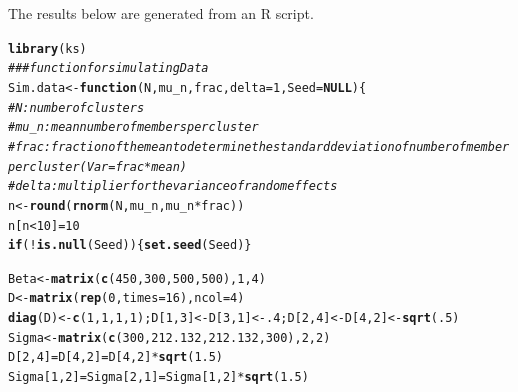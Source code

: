 \documentclass{article}\usepackage[]{graphicx}\usepackage[]{xcolor}
\makeatletter
\newcommand{\hlnum}[1]{\textcolor[rgb]{0.686,0.059,0.569}{#1}}%
\newcommand{\hlcom}[1]{\textcolor[rgb]{0.678,0.584,0.686}{\textit{#1}}}%
\newcommand{\hlopt}[1]{\textcolor[rgb]{0,0,0}{#1}}%
\newcommand{\hldef}[1]{\textcolor[rgb]{0.345,0.345,0.345}{#1}}%
\newcommand{\hlkwa}[1]{\textcolor[rgb]{0.161,0.373,0.58}{\textbf{#1}}}%
\newcommand{\hlkwb}[1]{\textcolor[rgb]{0.69,0.353,0.396}{#1}}%
\newcommand{\hlkwc}[1]{\textcolor[rgb]{0.333,0.667,0.333}{#1}}%
\newcommand{\hlkwd}[1]{\textcolor[rgb]{0.737,0.353,0.396}{\textbf{#1}}}%
\newenvironment{kframe}{%
 \def\at@end@of@kframe{}%
 \ifinner\ifhmode%
  \def\at@end@of@kframe{\end{minipage}}%
  \begin{minipage}{\columnwidth}%
 \fi\fi%
 \def\FrameCommand##1{\hskip\@totalleftmargin \hskip-\fboxsep
 \colorbox{shadecolor}{##1}\hskip-\fboxsep
     \hskip-\linewidth \hskip-\@totalleftmargin \hskip\columnwidth}%
 \MakeFramed {\advance\hsize-\width
   \@totalleftmargin\z@ \linewidth\hsize
   \@setminipage}}%
 {\par\unskip\endMakeFramed%
 \at@end@of@kframe}
\newenvironment{knitrout}{}{} %
\makeatother
\begin{document}
\title{\title{}}



\maketitle
The results below are generated from an R script.

\begin{knitrout}
\color{fgcolor}\begin{kframe}
\begin{alltt}
\hlkwd{library}\hldef{(ks)}
\hlcom{### function for simulating Data}
\hldef{Sim.data} \hlkwb{<-} \hlkwa{function}\hldef{(}\hlkwc{N}\hldef{,}\hlkwc{mu_n}\hldef{,}\hlkwc{frac}\hldef{,}\hlkwc{delta}\hldef{=}\hlnum{1}\hldef{,}\hlkwc{Seed}\hldef{=}\hlkwa{NULL}\hldef{)\{}
  \hlcom{# N: number of clusters}
  \hlcom{# mu_n: mean number of members per cluster}
  \hlcom{# frac: fraction of the mean to determine the standard deviation of number of member per cluster (Var = frac*mean)}
  \hlcom{# delta: multiplier for the variance of random effects}
  \hldef{n} \hlkwb{<-} \hlkwd{round}\hldef{(}\hlkwd{rnorm}\hldef{(N,mu_n,mu_n}\hlopt{*}\hldef{frac))}
  \hldef{n[n}\hlopt{<}\hlnum{10}\hldef{]} \hlkwb{=} \hlnum{10}
  \hlkwa{if}\hldef{(}\hlopt{!}\hlkwd{is.null}\hldef{(Seed))\{}\hlkwd{set.seed}\hldef{(Seed)\}}

  \hldef{Beta} \hlkwb{<-} \hlkwd{matrix}\hldef{(}\hlkwd{c}\hldef{(}\hlnum{450}\hldef{,}\hlnum{300}\hldef{,}\hlnum{500}\hldef{,}\hlnum{500}\hldef{),}\hlnum{1}\hldef{,}\hlnum{4}\hldef{)}
  \hldef{D} \hlkwb{<-} \hlkwd{matrix}\hldef{(}\hlkwd{rep}\hldef{(}\hlnum{0}\hldef{,} \hlkwc{times}\hldef{=}\hlnum{16}\hldef{),} \hlkwc{ncol}\hldef{=}\hlnum{4}\hldef{)}
  \hlkwd{diag}\hldef{(D)} \hlkwb{<-} \hlkwd{c}\hldef{(}\hlnum{1}\hldef{,} \hlnum{1}\hldef{,} \hlnum{1}\hldef{,} \hlnum{1}\hldef{);D[}\hlnum{1}\hldef{,} \hlnum{3}\hldef{]} \hlkwb{<-} \hldef{D[}\hlnum{3}\hldef{,} \hlnum{1}\hldef{]} \hlkwb{<-} \hlnum{.4}\hldef{; D[}\hlnum{2}\hldef{,} \hlnum{4}\hldef{]} \hlkwb{<-} \hldef{D[}\hlnum{4}\hldef{,} \hlnum{2}\hldef{]} \hlkwb{<-} \hlkwd{sqrt}\hldef{(}\hlnum{.5}\hldef{)}
  \hldef{Sigma} \hlkwb{<-} \hlkwd{matrix}\hldef{(}\hlkwd{c}\hldef{(}\hlnum{300}\hldef{,}\hlnum{212.132}\hldef{,}\hlnum{212.132}\hldef{,}\hlnum{300}\hldef{),}\hlnum{2}\hldef{,}\hlnum{2}\hldef{)}
  \hldef{D[}\hlnum{2}\hldef{,}\hlnum{4}\hldef{]} \hlkwb{=} \hldef{D[}\hlnum{4}\hldef{,}\hlnum{2}\hldef{]} \hlkwb{=} \hldef{D[}\hlnum{4}\hldef{,}\hlnum{2}\hldef{]}\hlopt{*}\hlkwd{sqrt}\hldef{(}\hlnum{1.5}\hldef{)}
  \hldef{Sigma[}\hlnum{1}\hldef{,}\hlnum{2}\hldef{]} \hlkwb{=} \hldef{Sigma[}\hlnum{2}\hldef{,}\hlnum{1}\hldef{]} \hlkwb{=} \hldef{Sigma[}\hlnum{1}\hldef{,}\hlnum{2}\hldef{]}\hlopt{*}\hlkwd{sqrt}\hldef{(}\hlnum{1.5}\hldef{)}


\end{alltt}
\end{kframe}
\end{knitrout}
\end{document}
